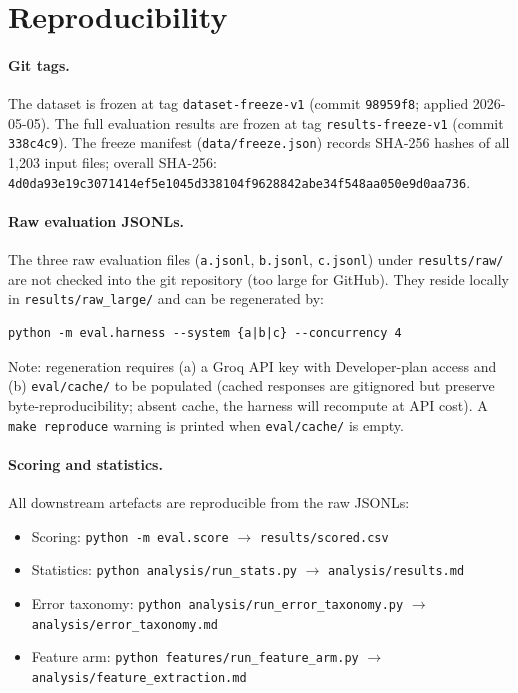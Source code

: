 
\section{Reproducibility}
\label{sec:reproducibility}

\paragraph{Git tags.}
The dataset is frozen at tag \texttt{dataset-freeze-v1} (commit \texttt{98959f8};
applied 2026-05-05).  The full evaluation results are frozen at tag
\texttt{results-freeze-v1} (commit \texttt{338c4c9}).  The freeze manifest (\texttt{data/freeze.json})
records SHA-256 hashes of all 1,203 input files;
overall SHA-256:
\texttt{4d0da93e19c3071414ef5e1045d338104f9628842abe34f548aa050e9d0aa736}.

\paragraph{Raw evaluation JSONLs.}
The three raw evaluation files (\texttt{a.jsonl}, \texttt{b.jsonl}, \texttt{c.jsonl})
under \texttt{results/raw/} are not checked into the git repository (too large
for GitHub).  They reside locally in \texttt{results/raw\_large/} and can be
regenerated by:
\begin{verbatim}
python -m eval.harness --system {a|b|c} --concurrency 4
\end{verbatim}
\noindent Note: regeneration requires (a) a Groq API key with Developer-plan access
and (b) \texttt{eval/cache/} to be populated (cached responses are gitignored but
preserve byte-reproducibility; absent cache, the harness will recompute at API cost).
A \texttt{make reproduce} warning is printed when \texttt{eval/cache/} is empty.

\paragraph{Scoring and statistics.}
All downstream artefacts are reproducible from the raw JSONLs:
\begin{itemize}
  \item Scoring: \texttt{python -m eval.score}
    $\rightarrow$ \texttt{results/scored.csv}
  \item Statistics: \texttt{python analysis/run\_stats.py}
    $\rightarrow$ \texttt{analysis/results.md}
  \item Error taxonomy: \texttt{python analysis/run\_error\_taxonomy.py}
    $\rightarrow$ \texttt{analysis/error\_taxonomy.md}
  \item Feature arm: \texttt{python features/run\_feature\_arm.py}
    $\rightarrow$ \texttt{analysis/feature\_extraction.md}
\end{itemize}

